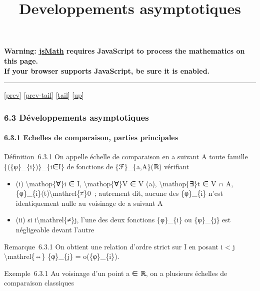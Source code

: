 \documentclass[]{article}
\title{Developpements asymptotiques}
\author{}
\date{}
\begin{document}
\maketitle

\textbf{Warning: \href{http://www.math.union.edu/locate/jsMath}{jsMath}
requires JavaScript to process the mathematics on this page.\\ If your
browser supports JavaScript, be sure it is enabled.}

\begin{center}\rule{3in}{0.4pt}\end{center}

{[}\href{coursse33.html}{prev}{]}
{[}\href{coursse33.html\#tailcoursse33.html}{prev-tail}{]}
{[}\hyperref[tailcoursse34.html]{tail}{]}
{[}\href{coursch7.html\#coursse34.html}{up}{]}

\subsubsection{6.3 Développements asymptotiques}

\paragraph{6.3.1 Echelles de comparaison, parties principales}

Définition~6.3.1 On appelle échelle de comparaison en a suivant A toute
famille \{(\{φ\}\_\{i\})\}\_\{i∈I\} de fonctions de \{ℱ\}\_\{a,A\}(ℝ)
vérifiant

\begin{itemize}
\itemsep1pt\parskip0pt
\item
  (i) \textbackslash{}mathop\{∀\}i ∈ I, \textbackslash{}mathop\{∀\}V ∈ V
  (a), \textbackslash{}mathop\{∃\}t ∈ V ∩ A,
  \{φ\}\_\{i\}(t)\textbackslash{}mathrel\{≠\}0~; autrement dit, aucune
  des \{φ\}\_\{i\} n'est identiquement nulle au voisinage de a suivant A
\item
  (ii) si i\textbackslash{}mathrel\{≠\}j, l'une des deux fonctions
  \{φ\}\_\{i\} ou \{φ\}\_\{j\} est négligeable devant l'autre
\end{itemize}

Remarque~6.3.1 On obtient une relation d'ordre strict sur I en posant i
\textless{} j \textbackslash{}mathrel\{⇔\} \{φ\}\_\{j\} =
o(\{φ\}\_\{i\}).

Exemple~6.3.1 Au voisinage d'un point a ∈ ℝ, on a plusieurs échelles de
comparaison classiques
\end{document}

